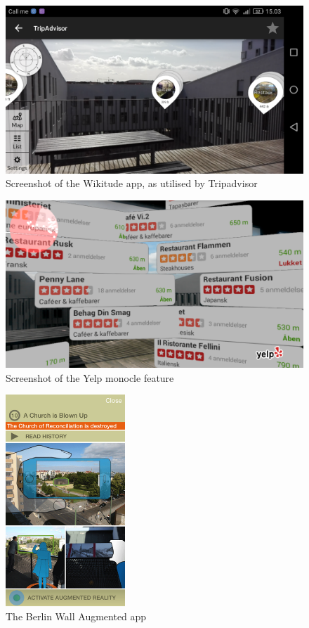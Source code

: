\begin{figure}[h!]
    \centering
    \includegraphics[width=\textwidth]{figures/wikitude.png}
    \caption{Screenshot of the Wikitude app, as utilised by Tripadvisor}\label{fig:wikitude}
\end{figure}
\hfill
\begin{figure}[h!]
    \centering
    \includegraphics[width=\textwidth]{figures/yelp.png}
    \caption{Screenshot of the Yelp monocle feature}\label{fig:yelp}
\end{figure}

\pagebreak

\begin{figure}
\centering
        \includegraphics[width=0.4\textwidth]{figures/berlinwall.jpeg}
        \caption{The Berlin Wall Augmented app \cite{Hardenberg}}\label{fig:berlin}
\end{figure}

